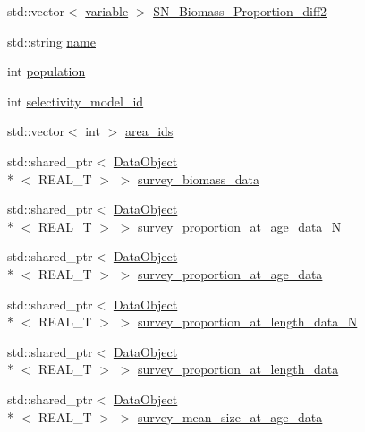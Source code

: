 \begin{DoxyCompactItemize}
std\-::vector$<$ \hyperlink{structmas_1_1_survey_ae91896013e1a3403f7e3d79b1f845966}{variable} $>$ \hyperlink{structmas_1_1_survey_a2b909685f664b5453d5dfb38b84452cf}{S\-N\-\_\-\-Biomass\-\_\-\-Proportion\-\_\-diff2}
\item 
std\-::string \hyperlink{structmas_1_1_survey_a8fd8098e67c99e6dbd98ebad552693ee}{name}
\item 
int \hyperlink{structmas_1_1_survey_a6c064392c7b16513028547c473c612d4}{population}
\item 
int \hyperlink{structmas_1_1_survey_ab8a937f0a4f30704ad3d096389df45ae}{selectivity\-\_\-model\-\_\-id}
\item 
std\-::vector$<$ int $>$ \hyperlink{structmas_1_1_survey_a8aeefcfbec9baeea0786200f888da11f}{area\-\_\-ids}
\item 
std\-::shared\-\_\-ptr$<$ \hyperlink{structmas_1_1_data_object}{Data\-Object}\\*
$<$ R\-E\-A\-L\-\_\-\-T $>$ $>$ \hyperlink{structmas_1_1_survey_aed7561a0147e5abfa07acab7baa9292f}{survey\-\_\-biomass\-\_\-data}
\item 
std\-::shared\-\_\-ptr$<$ \hyperlink{structmas_1_1_data_object}{Data\-Object}\\*
$<$ R\-E\-A\-L\-\_\-\-T $>$ $>$ \hyperlink{structmas_1_1_survey_a5f29ffd1fbe8b5038854a1fce1204d04}{survey\-\_\-proportion\-\_\-at\-\_\-age\-\_\-data\-\_\-\-N}
\item 
std\-::shared\-\_\-ptr$<$ \hyperlink{structmas_1_1_data_object}{Data\-Object}\\*
$<$ R\-E\-A\-L\-\_\-\-T $>$ $>$ \hyperlink{structmas_1_1_survey_abe5be20bcd63fb69b91008672bcb76ff}{survey\-\_\-proportion\-\_\-at\-\_\-age\-\_\-data}
\item 
std\-::shared\-\_\-ptr$<$ \hyperlink{structmas_1_1_data_object}{Data\-Object}\\*
$<$ R\-E\-A\-L\-\_\-\-T $>$ $>$ \hyperlink{structmas_1_1_survey_a0b400422f471584cfb574d98fe54a5cc}{survey\-\_\-proportion\-\_\-at\-\_\-length\-\_\-data\-\_\-\-N}
\item 
std\-::shared\-\_\-ptr$<$ \hyperlink{structmas_1_1_data_object}{Data\-Object}\\*
$<$ R\-E\-A\-L\-\_\-\-T $>$ $>$ \hyperlink{structmas_1_1_survey_a12418ba69c060c3778d723ad162dd1ba}{survey\-\_\-proportion\-\_\-at\-\_\-length\-\_\-data}
\item 
std\-::shared\-\_\-ptr$<$ \hyperlink{structmas_1_1_data_object}{Data\-Object}\\*
$<$ R\-E\-A\-L\-\_\-\-T $>$ $>$ \hyperlink{structmas_1_1_survey_a32474f16bef5d94a531f52dbd91b2305}{survey\-\_\-mean\-\_\-size\-\_\-at\-\_\-age\-\_\-data}

\end{DoxyCompactItemize}
